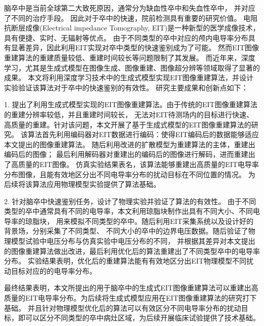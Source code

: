 
\begin{chineseabstract}

    脑卒中是当前全球第二大致死原因，通常分为缺血性卒中和失血性卒中，
    并对应了不同的治疗手段。
    因此对于卒中的快速，院前检测具有重要的研究价值。
    电阻抗断层成像(Electrical impedance Tomography, EIT)是一种新型的医学成像技术，具有便捷、实时、无辐射等优点。
    由于不同类型的卒中对应的颅内电导率分布具有显著差异，因此利用EIT实现对卒中类型的快速鉴别成为了可能。
    然而EIT图像重建算法的重建质量较低、重建时间较长等问题限制了其发展。
    而近年来，深度学习，尤其是生成式模型在图像生成、图像重建、图像超分辨等领域取得了显著的成果。
    本文将利用深度学习技术中的生成式模型实现EIT图像重建算法，并设计实验验证该算法对于卒中的快速鉴别的有效性。
    研究主要成果和创新点如下：

    1. 提出了利用生成式模型实现的EIT图像重建算法。由于传统的EIT图像重建算法的重建分辨率较低，并且重建时间较长，
    无法对EIT待测场内的目标进行快速、高质量的重建。针对该问题，本文开展了基于生成式模型的EIT图像重建算法的研究。
    该算法首先利用编码器对EIT数据进行编码：使得EIT编码后的数据能够适应本文提出的图像重建算法。
    随后利用改进的扩散模型为重建算法的主体，重建出编码后的图像；
    最后利用解码器对重建出的编码后的图像进行解码，进而重建出了高质量的EIT图像。
    仿真实验结果表名，该算法能够重建出高质量的EIT电导率分布图像，且能有效地区分出不同电导率分布的扰动目标在不同位置的情况。
    为后续将该算法应用物理模型实验提供了算法基础。
    

    2. 针对脑卒中快速鉴别任务，设计了物理实验并验证了算法的有效性。
    由于不同类型的卒中通常具有不同的电导率，本文利用琼脂块制作出具有不同大小、不同电导率的琼脂块，
    用来模拟不同类型的卒中。随后利用EIT采集系统以及设计好的背景场，分别采集了不同类型、
    不同大小的卒中的边界电压数据。随后验证了物理模型试验中电压分布与仿真实验中电压分布的不同，
    并根据其差异对本文提出的图像重建算法做出改进，最后利用优化后的算法重建出了不同类型卒中的电导率分布。
    实验结果表明，优化后的重建算法能有有效地区分出EIT物理模型不同扰动目标对应的的电导率分布。
    
    最终结果表明，本文所提出的用于脑卒中的生成式EIT图像重建算法可以重建出高质量的EIT电导率分布。为后续将生成式模型应用在EIT图像重建算法的研究打下基础。
    并且针对物理模型优化后的算法可以有效区分不同电导率分布的扰动目标，即可以区分不同类型的卒中病灶区域，为后续开展临床试验提供了技术基础。






\end{chineseabstract}

